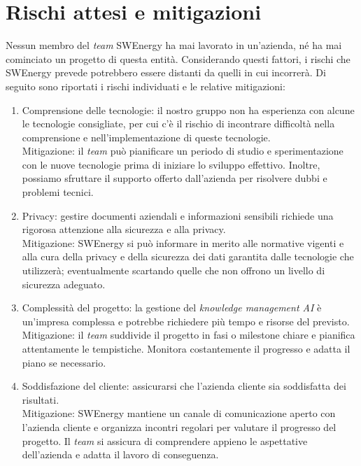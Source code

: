 \section{Rischi attesi e mitigazioni}

Nessun membro del \textit{team} SWEnergy ha mai lavorato in un'azienda, né ha
mai cominciato un progetto di questa entità. Considerando questi fattori, i
rischi che SWEnergy prevede potrebbero essere distanti da quelli in cui
incorrerà. 
Di seguito sono riportati i rischi individuati e le relative mitigazioni:
\begin{enumerate}

\item Comprensione delle tecnologie: il nostro gruppo non ha esperienza 
con alcune le tecnologie consigliate, per cui c'è il rischio di incontrare 
difficoltà nella comprensione e nell'implementazione di queste tecnologie. \\
Mitigazione: il \textit{team} può pianificare un periodo di studio e 
sperimentazione con 
le nuove tecnologie prima di iniziare lo sviluppo effettivo. Inoltre, possiamo 
sfruttare il supporto offerto dall'azienda per risolvere dubbi e problemi 
tecnici.

\item Privacy: gestire documenti aziendali e 
informazioni sensibili richiede una rigorosa attenzione alla sicurezza e alla 
privacy. \\
Mitigazione: SWEnergy si può informare in merito alle normative vigenti e alla
cura della privacy e della sicurezza dei dati garantita dalle tecnologie che
utilizzerà; eventualmente scartando quelle che non offrono un livello di
sicurezza adeguato.

\item Complessità del progetto: la gestione del \textit{knowledge management AI} 
è
un'impresa complessa e potrebbe richiedere più tempo e risorse del previsto. \\
Mitigazione: il \textit{team} suddivide il progetto in fasi o milestone chiare e 
pianifica attentamente le tempistiche. Monitora costantemente il progresso e
adatta il piano se necessario. 

\item Soddisfazione del cliente: assicurarsi che l'azienda cliente sia 
soddisfatta dei risultati. \\
Mitigazione: SWEnergy mantiene un canale di comunicazione aperto con l'azienda 
cliente e organizza incontri regolari per valutare il progresso del progetto. 
Il \textit{team} si assicura di comprendere appieno le aspettative dell'azienda 
e adatta il lavoro di conseguenza.
\end{enumerate}
